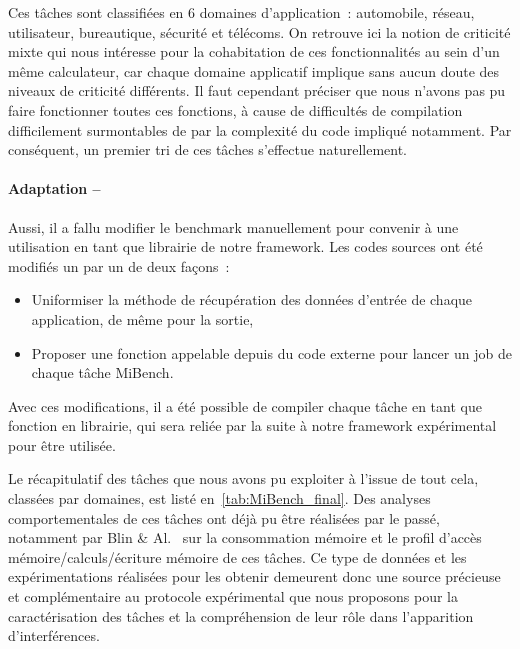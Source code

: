 \documentclass[french, a4paper, 11pt, twoside, pdftex]{StyleThese}
\begin{document}
    
    Ces tâches sont classifiées en 6 domaines d'application~: automobile, réseau, utilisateur, bureautique, sécurité et télécoms. On retrouve ici la notion de criticité mixte qui nous intéresse pour la cohabitation de ces fonctionnalités au sein d'un même calculateur, car chaque domaine applicatif implique sans aucun doute des niveaux de criticité différents.
    Il faut cependant préciser que nous n'avons pas pu faire fonctionner toutes ces fonctions, à cause de difficultés de compilation difficilement surmontables de par la complexité du code impliqué notamment. Par conséquent, un premier tri de ces tâches s'effectue naturellement. 
    
 	\paragraph{Adaptation --} Aussi, il a fallu modifier le benchmark manuellement pour convenir à une utilisation en tant que librairie de notre framework. Les codes sources ont été modifiés un par un de deux façons~: 
	\begin{itemize}
		\item  	Uniformiser la méthode de récupération des données d'entrée de chaque application, de même pour la sortie,
		\item  	Proposer une fonction appelable depuis du code externe pour lancer un job de chaque tâche MiBench.
	\end{itemize} Avec ces modifications, il a été possible de compiler chaque tâche en tant que fonction en librairie, qui sera reliée par la suite à notre framework expérimental pour être utilisée.

 	Le récapitulatif des tâches que nous avons pu exploiter à l'issue de tout cela, classées par domaines, est listé en~\autoref{tab:MiBench_final}. Des analyses comportementales de ces tâches ont déjà pu être réalisées par le passé, notamment par Blin \& Al.~\cite{blin_understanding_2016} sur la consommation mémoire et le profil d'accès mémoire/calculs/écriture mémoire de ces tâches. Ce type de données et les expérimentations réalisées pour les obtenir demeurent donc une source précieuse et complémentaire au protocole expérimental que nous proposons pour la caractérisation des tâches et la compréhension de leur rôle dans l'apparition d'interférences.
    
\end{document}
